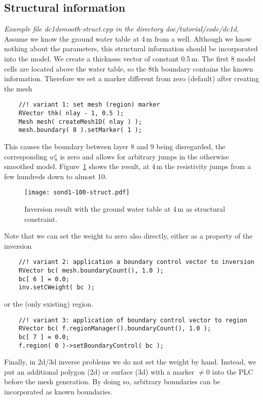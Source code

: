\subsection{Structural information}\label{sec:dc1dstruct}
{\em Example file dc1dsmooth-struct.cpp in the directory doc/tutorial/code/dc1d.}\\
Assume we know the ground water table at 4\,m from a well.
Although we know nothing about the parameters, this structural information should be incorporated into the model.
We create a thickness vector of constant 0.5\,m. 
The first 8 model cells are located above the water table, so the 8th boundary contains the known information.
Therefore we set a marker different from zero (default) after creating the mesh
\begin{lstlisting}
    //! variant 1: set mesh (region) marker
    RVector thk( nlay - 1, 0.5 );
    Mesh mesh( createMesh1D( nlay ) );
    mesh.boundary( 8 ).setMarker( 1 );
\end{lstlisting}
This causes the boundary between layer 8 and 9 being disregarded, the corresponding $w^c_8$ is zero and allows for arbitrary jumps in the otherwise smoothed model.
Figure~\ref{fig:dc1dsmooth-struct} shows the result, at 4\,m the resistivity jumps from a few hundreds down to almost 10.

\begin{figure}[htbp]
\centering\texttt{[image: sond1-100-struct.pdf]}
\caption{Inversion result with the ground water table at 4\,m as structural constraint.}\label{fig:dc1dsmooth-struct}
\end{figure}

Note that we can set the weight to zero also directly, either as a property of the inversion
\begin{lstlisting}
    //! variant 2: application a boundary control vector to inversion
    RVector bc( mesh.boundaryCount(), 1.0 );
    bc[ 6 ] = 0.0;
    inv.setCWeight( bc );
\end{lstlisting}
or the (only existing) region.
\begin{lstlisting}
    //! variant 3: application of boundary control vector to region
    RVector bc( f.regionManager().boundaryCount(), 1.0 );
    bc[ 7 ] = 0.0;
    f.region( 0 )->setBoundaryControl( bc );
\end{lstlisting}
Finally, in 2d/3d inverse problems we do not set the weight by hand.
Instead, we put an additional polygon (2d) or surface (3d) with a marker $\neq 0$ into the PLC before the mesh generation.
By doing so, arbitrary boundaries can be incorporated as known boundaries.

